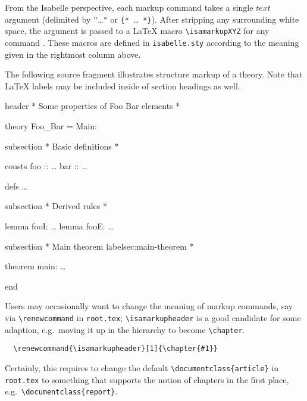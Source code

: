\begin{isabellebody}
\begin{isamarkuptext}
  \medskip

  From the Isabelle perspective, each markup command takes a single
  $text$ argument (delimited by \verb,",\dots\verb,", or
  \verb,{,\verb,*,~\dots~\verb,*,\verb,},).  After stripping any
  surrounding white space, the argument is passed to a {\LaTeX} macro
  \verb,\isamarkupXYZ, for any command .  These macros
  are defined in \verb,isabelle.sty, according to the meaning given in
  the rightmost column above.

  \medskip The following source fragment illustrates structure markup
  of a theory.  Note that {\LaTeX} labels may be included inside of
  section headings as well.

  \begin{ttbox}
  header {\ttlbrace}* Some properties of Foo Bar elements *{\ttrbrace}

  theory Foo_Bar = Main:

  subsection {\ttlbrace}* Basic definitions *{\ttrbrace}

  consts
    foo :: \dots
    bar :: \dots

  defs \dots

  subsection {\ttlbrace}* Derived rules *{\ttrbrace}

  lemma fooI: \dots
  lemma fooE: \dots

  subsection {\ttlbrace}* Main theorem {\ttback}label{\ttlbrace}sec:main-theorem{\ttrbrace} *{\ttrbrace}

  theorem main: \dots

  end
  \end{ttbox}

  Users may occasionally want to change the meaning of markup
  commands, say via \verb,\renewcommand, in \texttt{root.tex};
  \verb,\isamarkupheader, is a good candidate for some adaption, e.g.\
  moving it up in the hierarchy to become \verb,\chapter,.

\begin{verbatim}
  \renewcommand{\isamarkupheader}[1]{\chapter{#1}}
\end{verbatim}

  \noindent Certainly, this requires to change the default
  \verb,\documentclass{article}, in \texttt{root.tex} to something
  that supports the notion of chapters in the first place, e.g.\
  \verb,\documentclass{report},.


\end{isamarkuptext}
\end{isabellebody}
